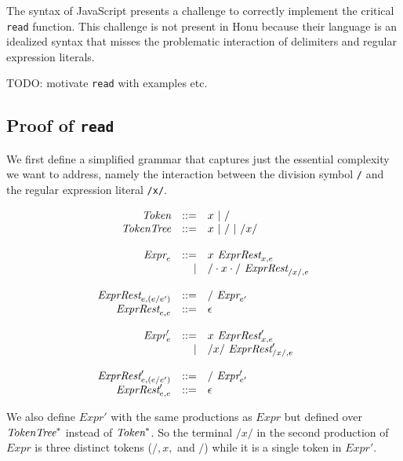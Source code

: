 \documentclass[preprint,10pt]{sigplanconf}
\begin{document}
The syntax of JavaScript presents a challenge to correctly implement
the critical \texttt{read} function. This challenge is not present in Honu
because their language is an idealized syntax that misses the
problematic interaction of delimiters and regular expression literals.

TODO: motivate \texttt{read} with examples etc.

\subsection{Proof of \texttt{read}}
\label{sec-3-1}

We first define a simplified grammar that captures just the essential
complexity we want to address, namely the interaction between
the division symbol \texttt{/} and the regular expression literal
\texttt{/x/}.

\[
\begin{array}{rrl}
  \textit{Token} &::=& x ~|~ /
  \\
  \textit{TokenTree} &::=& x ~|~ / ~|~ /x/
  \\
  \\
  \textit{Expr}_e 
  &::=& x~\textit{ExprRest}_{x, e}
  \\
  &|& /\cdot x \cdot /~\textit{ExprRest}_{/x/, e}
  \\
  \\
  \textit{ExprRest}_{e, (e / e')}
  &::=&
  /~\textit{Expr}_{e'}
  \\
  \textit{ExprRest}_{e, e}
  &::=&
  \epsilon
  \\
  \\
  \textit{Expr}_e' 
  &::=& x~\textit{ExprRest}_{x, e}'
  \\
  &|& /x/~\textit{ExprRest}_{/x/, e}'
  \\
  \\
  \textit{ExprRest}_{e, (e / e')}'
  &::=&
  /~\textit{Expr}_{e'}'
  \\
  \textit{ExprRest}_{e, e}'
  &::=&
  \epsilon
\end{array}
\]

We also define \( \textit{Expr}' \) with the same productions as \(
\textit{Expr} \) but defined over \( \textit{TokenTree}^{*} \) instead of \( \textit{Token}^{*}
\). So the terminal \( /x/ \) in the second production of \(
\textit{Expr} \) is three distinct tokens (\( /, x, \) and \( /
\)) while it is a single token in \( \textit{Expr}' \).
\end{document}
